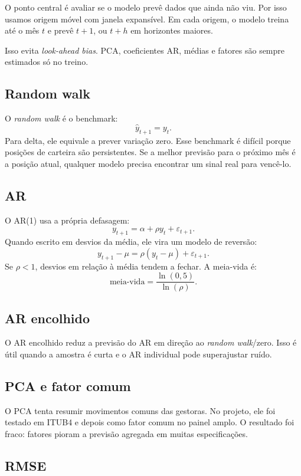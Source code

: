 \documentclass[11pt,a4paper]{article}
\begin{document}
O ponto central é avaliar se o modelo prevê dados que ainda não viu. Por isso usamos origem móvel com janela
expansível. Em cada origem, o modelo treina até o mês $t$ e prevê $t+1$, ou $t+h$ em horizontes maiores.

Isso evita \emph{look-ahead bias}. PCA, coeficientes AR, médias e fatores são sempre estimados só no treino.

\subsection{Random walk}

O \emph{random walk} é o benchmark:
\[
\hat{y}_{t+1}=y_t.
\]
Para delta, ele equivale a prever variação zero. Esse benchmark é difícil porque posições de carteira são
persistentes. Se a melhor previsão para o próximo mês é a posição atual, qualquer modelo precisa encontrar
um sinal real para vencê-lo.

\subsection{AR}

O AR(1) usa a própria defasagem:
\[
y_{t+1}=\alpha+\rho y_t+\varepsilon_{t+1}.
\]
Quando escrito em desvios da média, ele vira um modelo de reversão:
\[
y_{t+1}-\mu=\rho(y_t-\mu)+\varepsilon_{t+1}.
\]
Se $\rho<1$, desvios em relação à média tendem a fechar. A meia-vida é:
\[
\text{meia-vida}=\frac{\ln(0,5)}{\ln(\rho)}.
\]

\subsection{AR encolhido}

O AR encolhido reduz a previsão do AR em direção ao \emph{random walk}/zero. Isso é útil quando a amostra é
curta e o AR individual pode superajustar ruído.

\subsection{PCA e fator comum}

O PCA tenta resumir movimentos comuns das gestoras. No projeto, ele foi testado em ITUB4 e depois como fator
comum no painel amplo. O resultado foi fraco: fatores pioram a previsão agregada em muitas especificações.

\subsection{RMSE}
\end{document}
